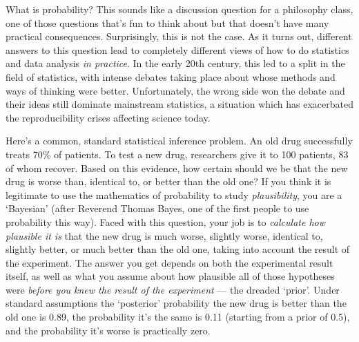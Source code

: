 \documentclass[a4paper, 12pt]{article}
\title{}
\author{Brendon J. Brewer}
\begin{document}
\sffamily
\maketitle

What is probability? This sounds like a discussion question for a
philosophy class, one of those questions that's fun to think about but that
doesn't have many practical consequences. Surprisingly, this is not the case.
As it turns out, different answers to this question lead to completely
different views of how to do statistics and data analysis {\em in practice}.
In the early 20th century, this led to a split in the field of statistics,
with intense debates taking place about whose methods and ways of thinking
were better. Unfortunately, the wrong side won the debate and their
ideas still dominate mainstream statistics, a situation which
has exacerbated the reproducibility crises affecting science today.

Here's a common, standard statistical inference problem. An old drug
successfully treats 70\% of patients. To test a new drug, researchers give it
to 100 patients, 83 of whom recover. Based on this evidence, how certain
should we be that the new drug is worse than, identical to, or better than the
old one? If you think it is legitimate to use the mathematics of probability
to study {\em plausibility}, you are a `Bayesian' (after Reverend
Thomas Bayes, one of the first people to use probability this way). Faced with
this question, your job is to {\em calculate how plausible it is} that the new
drug is much worse, slightly worse, identical to, slightly better, or much better
than the old one, taking into account the result of the experiment. The answer
you get
depends on both the experimental result itself, as well as what you assume
about how plausible all of those hypotheses were {\em before you knew the result
of the experiment} --- the dreaded `prior'.
Under standard assumptions the `posterior' probability the new drug is better
than the old one is 0.89, the probability it's the same is 0.11 (starting
from a prior of 0.5), and the
probability it's worse is practically zero.
\end{document}
